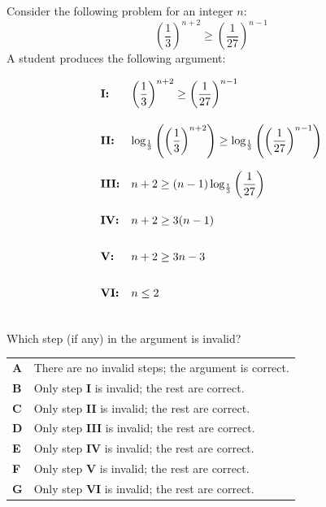 \documentclass[11pt,a4paper]{article}
\begin{document}
\begin{enumerate}[label=\textbf{\arabic*.},leftmargin=*,itemsep=0pt,start=8]
Consider the following problem for an integer $n$: \[ \left( \dfrac{1}{3} \right)^{n+2} \ge \left( \dfrac{1}{27} \right)^{n-1} \] A student produces the following argument:

\[ \begin{array}{@{}l l@{}}
\textbf{I:} & \text{$\left( \dfrac{1}{3} \right)^{n+2} \ge \left( \dfrac{1}{27} \right)^{n-1}$} \\[20pt]

\textbf{II:} & \text{$\log_{\frac{1}{3}} \left( \left( \dfrac{1}{3} \right)^{n+2} \right) \ge \log_{\frac{1}{3}} \left( \left( \dfrac{1}{27} \right)^{n-1} \right)$} \\[20pt]

\textbf{III:} & \text{$n+2 \ge (n-1)\log_{\frac{1}{3}} \left( \dfrac{1}{27} \right)$} \\[20pt]

\textbf{IV:} & \text{$n+2 \ge 3(n-1)$} \\[20pt]

\textbf{V:} & \text{$n+2 \ge 3n-3$} \\[20pt]

\textbf{VI:} & \text{$n \le 2$} \\[20pt]
\end{array} \] Which step (if any) in the argument is invalid?

\par\vspace*{12pt}
\begin{tabularx}{\linewidth}{@{}>{\bfseries}l Y@{}}
A &
There are no invalid steps; the argument is correct.
\\[0.8em]
B &
Only step \textbf{I} is invalid; the rest are correct.
\\[0.8em]
C &
Only step \textbf{II} is invalid; the rest are correct.
\\[0.8em]
D &
Only step \textbf{III} is invalid; the rest are correct.
\\[0.8em]
E &
Only step \textbf{IV} is invalid; the rest are correct.
\\[0.8em]
F &
Only step \textbf{V} is invalid; the rest are correct.
\\[0.8em]
G &
Only step \textbf{VI} is invalid; the rest are correct.
\\
\end{tabularx}


\end{enumerate}
\end{document}
